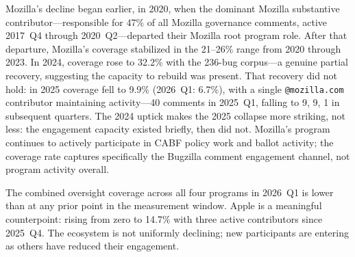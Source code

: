 \documentclass[10pt,twocolumn,letterpaper]{article}
\begin{document}
Mozilla's decline began earlier, in 2020, when the dominant Mozilla
substantive contributor---responsible for 47\% of all Mozilla governance
comments, active 2017~Q4 through 2020~Q2---departed their Mozilla root
program role. After that departure, Mozilla's coverage stabilized in the
21--26\% range from 2020 through 2023. In 2024, coverage rose to 32.2\%
with the 236-bug corpus---a genuine partial recovery, suggesting the
capacity to rebuild was present. That recovery did not hold: in 2025
coverage fell to 9.9\% (2026~Q1: 6.7\%), with a single
\texttt{@mozilla.com} contributor maintaining activity---40 comments in
2025~Q1, falling to 9, 9, 1 in subsequent quarters. The 2024 uptick
makes the 2025 collapse more striking, not less: the engagement capacity
existed briefly, then did not. Mozilla's program continues to actively
participate in CABF policy work and ballot activity; the coverage rate
captures specifically the Bugzilla comment engagement channel, not program
activity overall.

The combined oversight coverage across all four programs in 2026~Q1 is
lower than at any prior point in the measurement window. Apple is a
meaningful counterpoint: rising from zero to 14.7\% with three active
contributors since 2025~Q4. The ecosystem is not uniformly declining;
new participants are entering as others have reduced their engagement.
\end{document}
